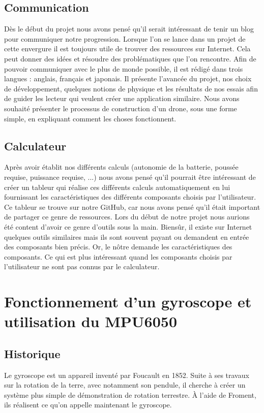 \documentclass[a4paper,10pt]{report}
\begin{document}
      \section{Communication}
	Dès le début du projet nous avons pensé qu'il serait intéressant de 
tenir un blog pour communiquer notre progression. Lorsque l'on se lance dans un 
projet de cette envergure il est toujours utile de trouver des ressources sur 
Internet. Cela peut donner des idées et résoudre des problématiques que l'on 
rencontre. Afin de pouvoir communiquer avec le plus de monde possible, il est 
rédigé dans trois langues : anglais, français et japonais. Il présente 
l'avancée du projet, nos choix de développement, quelques notions de physique 
et les résultats de nos essais afin de guider les lecteur qui veulent créer une 
application similaire. Nous avons souhaité présenter le processus de 
construction d'un drone, sous une forme simple, en expliquant comment les 
choses fonctionnent.

      \section{Calculateur}
	\label{sec:calculateur}
	Après avoir établit nos différents calculs (autonomie de la batterie, 
poussée requise, puissance requise, ...) nous avons pensé qu'il pourrait être 
intéressant de créer un tableur qui réalise ces différents calculs 
automatiquement en lui fournissant les caractéristiques des différents 
composants choisis par l'utilisateur. Ce tableur se trouve sur notre GitHub, 
car nous avons pensé qu'il était important de partager ce genre de ressources. 
Lors du début de notre projet nous aurions été content d'avoir ce genre 
d'outils sous la main. Biensûr, il existe sur Internet quelques outils 
similaires\cite{dronecalc} mais ils sont souvent payant ou demandent en entrée 
des composants bien précis. Or, le nôtre demande les caractéristiques des 
composants. Ce qui est plus intéressant quand les composants choisis par 
l'utilisateur ne sont pas connus par le calculateur.
	
    \chapter{Fonctionnement d'un gyroscope et utilisation du MPU6050}
      \section{Historique}
	Le gyroscope est un appareil inventé par Foucault en 1852. Suite à ses 
travaux sur la rotation de la terre, avec notamment son pendule, il cherche à 
créer un système plus simple de démonstration de rotation terrestre. À l'aide 
de Froment, ils réalisent ce qu'on appelle maintenant le gyroscope.
\end{document}
